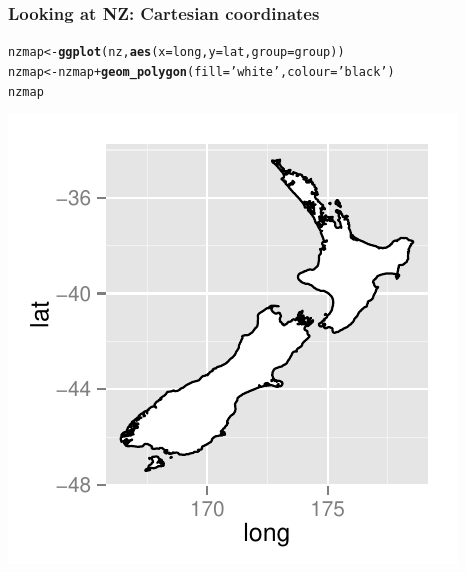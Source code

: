 \documentclass{beamer}\usepackage{graphicx, color}
\makeatletter
\def\maxwidth{ %
  \ifdim\Gin@nat@width>\linewidth
    \linewidth
  \else
    \Gin@nat@width
  \fi
}
\newcommand{\hlfunctioncall}[1]{\textcolor[rgb]{0.501960784313725,0,0.329411764705882}{\textbf{#1}}}%
\newcommand{\hlstring}[1]{\textcolor[rgb]{0.6,0.6,1}{#1}}%
\newenvironment{kframe}{%
 \def\at@end@of@kframe{}%
 \ifinner\ifhmode%
  \def\at@end@of@kframe{\end{minipage}}%
  \begin{minipage}{\columnwidth}%
 \fi\fi%
 \def\FrameCommand##1{\hskip\@totalleftmargin \hskip-\fboxsep
 \colorbox{shadecolor}{##1}\hskip-\fboxsep
     \hskip-\linewidth \hskip-\@totalleftmargin \hskip\columnwidth}%
 \MakeFramed {\advance\hsize-\width
   \@totalleftmargin\z@ \linewidth\hsize
   \@setminipage}}%
 {\par\unskip\endMakeFramed%
 \at@end@of@kframe}
\newenvironment{knitrout}{}{} %
\makeatother
\begin{document}
\begin{frame}[fragile]
  \frametitle{Looking at NZ: Cartesian coordinates}
\begin{knitrout}\scriptsize
{}\color{fgcolor}\begin{kframe}
\begin{alltt}
nzmap <- \hlfunctioncall{ggplot}(nz, \hlfunctioncall{aes}(x = long, y = lat, group = group))
nzmap <- nzmap + \hlfunctioncall{geom_polygon}(fill = \hlstring{'white'}, colour = \hlstring{'black'})
nzmap
\end{alltt}
\end{kframe}
\end{knitrout}

\end{frame}

\begin{frame}[fragile]
\begin{knitrout}\scriptsize
{}\color{fgcolor}
\includegraphics[width=\maxwidth]{figure/unnamed-chunk-5} 

\end{knitrout}

\end{frame}
\end{document}

